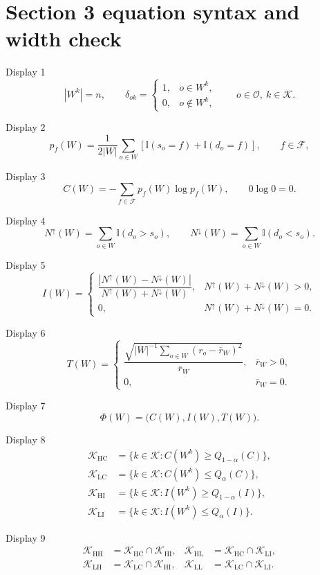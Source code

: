 \documentclass[a4paper,11pt]{article}
\begin{document}
\section*{Section 3 equation syntax and width check}

\noindent Display 1
\[
|W^k|=n,\qquad
\delta_{ok}=
\begin{cases}
1, & o\in W^k,\\
0, & o\notin W^k,
\end{cases}
\qquad o\in\mathcal O,\ k\in\mathcal K.
\tag{1}
\]

\noindent Display 2
\[
p_f(W)=\frac{1}{2|W|}
\sum_{o\in W}\left[\mathbb I(s_o=f)+\mathbb I(d_o=f)\right],
\qquad f\in\mathcal F,
\tag{2}
\]

\noindent Display 3
\[
C(W)=-\sum_{f\in\mathcal F}p_f(W)\log p_f(W),
\qquad 0\log0=0.
\tag{3}
\]

\noindent Display 4
\[
N^\uparrow(W)=\sum_{o\in W}\mathbb I(d_o>s_o),
\qquad
N^\downarrow(W)=\sum_{o\in W}\mathbb I(d_o<s_o).
\tag{4}
\]

\noindent Display 5
\[
I(W)=
\begin{cases}
\dfrac{|N^\uparrow(W)-N^\downarrow(W)|}
{N^\uparrow(W)+N^\downarrow(W)},
& N^\uparrow(W)+N^\downarrow(W)>0,\\
0, & N^\uparrow(W)+N^\downarrow(W)=0.
\end{cases}
\tag{5}
\]

\noindent Display 6
\[
T(W)=
\begin{cases}
\dfrac{\sqrt{|W|^{-1}\sum_{o\in W}(r_o-\bar r_W)^2}}{\bar r_W},
& \bar r_W>0,\\
0, & \bar r_W=0.
\end{cases}
\tag{6}
\]

\noindent Display 7
\[
\Phi(W)=\bigl(C(W),I(W),T(W)\bigr).
\tag{7}
\]

\noindent Display 8
\[
\begin{aligned}
\mathcal K_{\mathrm{HC}}&=\{k\in\mathcal K:C(W^k)\geq Q_{1-\alpha}(C)\},\\
\mathcal K_{\mathrm{LC}}&=\{k\in\mathcal K:C(W^k)\leq Q_\alpha(C)\},\\
\mathcal K_{\mathrm{HI}}&=\{k\in\mathcal K:I(W^k)\geq Q_{1-\alpha}(I)\},\\
\mathcal K_{\mathrm{LI}}&=\{k\in\mathcal K:I(W^k)\leq Q_\alpha(I)\}.
\end{aligned}
\tag{8}
\]

\noindent Display 9
\[
\begin{aligned}
\mathcal K_{\mathrm{HH}}&=\mathcal K_{\mathrm{HC}}\cap\mathcal K_{\mathrm{HI}},&
\mathcal K_{\mathrm{HL}}&=\mathcal K_{\mathrm{HC}}\cap\mathcal K_{\mathrm{LI}},\\
\mathcal K_{\mathrm{LH}}&=\mathcal K_{\mathrm{LC}}\cap\mathcal K_{\mathrm{HI}},&
\mathcal K_{\mathrm{LL}}&=\mathcal K_{\mathrm{LC}}\cap\mathcal K_{\mathrm{LI}}.
\end{aligned}
\tag{9}
\]
\end{document}
